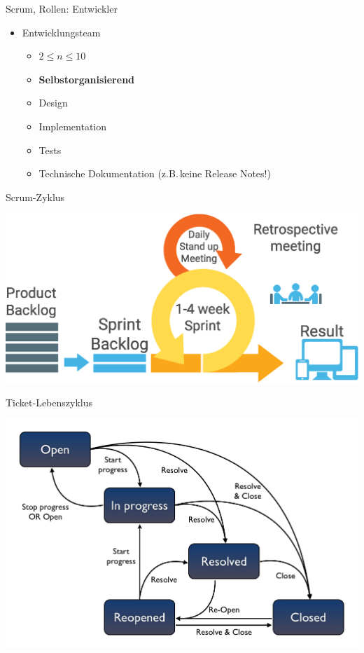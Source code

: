 \documentclass{beamer}
\begin{document}
\begin{frame}{Scrum, Rollen: Entwickler}
	\begin{itemize}
		\item Entwicklungsteam
			\begin{itemize}
				\item $2 \leq n \leq 10$
				\item \textbf{Selbstorganisierend}
				\item Design
				\item Implementation
				\item Tests
				\item Technische Dokumentation (z.B.\,keine Release Notes!)
			\end{itemize}
	\end{itemize}
\end{frame}

\begin{frame}{Scrum-Zyklus}
	\begin{center}
		\includegraphics[scale=.25]{scrum-process.eps}
	\end{center}
\end{frame}

\begin{frame}{Ticket-Lebenszyklus}
	\begin{center}
		\includegraphics[scale=.5]{jira-ticket-lifecycle.png}
	\end{center}
\end{frame}
\end{document}
